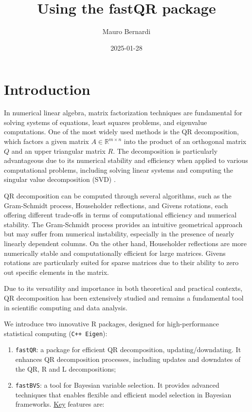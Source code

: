 \documentclass[]{tufte-handout}
\title[Using the fastQR package]{Using the fastQR package}
\author{Mauro Bernardi}
\date{2025-01-28}
\providecommand{\tightlist}{%
  \setlength{\itemsep}{0pt}\setlength{\parskip}{0pt}}
\begin{document}
\maketitle




\hypertarget{introduction}{%
\section{Introduction}\label{introduction}}

In numerical linear algebra, matrix factorization techniques are
fundamental for solving systems of equations, least squares problems,
and eigenvalue computations. One of the most widely used methods is the
QR decomposition, which factors a given matrix
\(A \in \mathbb{R}^{m \times n}\) into the product of an orthogonal
matrix \(Q\) and an upper triangular matrix \(R\). The decomposition is
particularly advantageous due to its numerical stability and efficiency
when applied to various computational problems, including solving linear
systems and computing the singular value decomposition (SVD)
\cite{golub2013matrix}.

QR decomposition can be computed through several algorithms, such as the
Gram-Schmidt process, Householder reflections, and Givens rotations,
each offering different trade-offs in terms of computational efficiency
and numerical stability. The Gram-Schmidt process provides an intuitive
geometrical approach but may suffer from numerical instability,
especially in the presence of nearly linearly dependent columns. On the
other hand, Householder reflections are more numerically stable and
computationally efficient for large matrices. Givens rotations are
particularly suited for sparse matrices due to their ability to zero out
specific elements in the matrix.

Due to its versatility and importance in both theoretical and practical
contexts, QR decomposition has been extensively studied and remains a
fundamental tool in scientific computing and data analysis.

We introduce two innovative R packages, designed for high-performance
statistical computing (\texttt{C++ Eigen}):

\begin{enumerate}
\def\labelenumi{\arabic{enumi}.}
\tightlist
\item
  \texttt{fastQR}: a package for efficient QR decomposition,
  updating/downdating. It enhances QR decomposition processes, including
  updates and downdates of the QR, R and L decompositions;
\item
  \texttt{fastBVS}: a tool for Bayesian variable selection. It provides
  advanced techniques that enables flexible and efficient model
  selection in Bayesian frameworks. \uline{Key} features are:
\end{enumerate}
\end{document}
